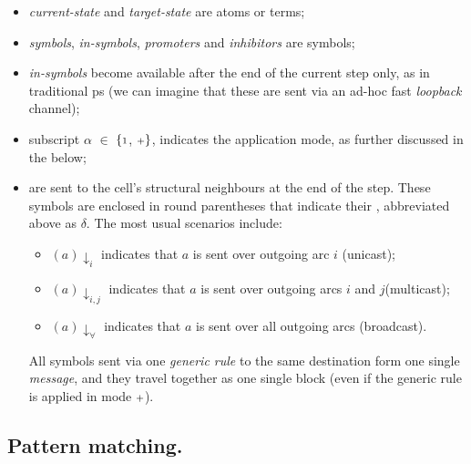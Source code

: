 \begin{itemize}
\item \emph{current-state} and \emph{target-state} are atoms or terms;

\smallskip
\item \emph{symbols}, \emph{in-symbols}, \emph{promoters} and \emph{inhibitors} are symbols;

\smallskip
\item \emph{in-symbols} become available after the end of the current step only, as in traditional \gls{ps}  (we can imagine that these are sent via an ad-hoc fast \emph{loopback} channel); 

\smallskip
\item subscript \(\alpha\) \(\in\) \(\{{\scriptstyle 1}\), \({\scriptstyle +}\}\), 
indicates the application mode, as further discussed in the below;

\smallskip
\item {} are sent to the cell's structural neighbours at the end of the step.
These symbols are enclosed in round parentheses that indicate 
their , abbreviated above as \(\delta\). 
The most usual scenarios include: 

\begin{itemize}
\item \((a)\downarrow_i\) indicates that \(a\) is sent over outgoing arc \(i\) (unicast); 

\item \((a)\downarrow_{i,j}\) indicates that \(a\) is sent over outgoing arcs \(i\) and \(j\)(multicast); 

\item \((a)\downarrow_\forall\) indicates that \(a\) is sent over all outgoing arcs (broadcast). 
\end{itemize}

All symbols sent via one \emph{generic rule} to the same destination form one single \emph{message}, and they travel together as one single block (even if the generic rule is applied in mode \({\scriptstyle +}\)).
\end{itemize}

\subsection{Pattern matching.}

